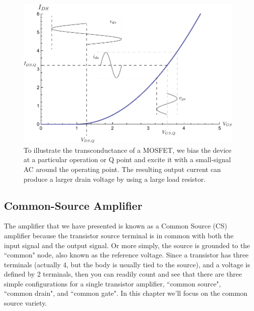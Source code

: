  
\begin{figure}[tb]
\begin{center}
\includegraphics[width=.75\columnwidth]{ids_vgs_vds}
\end{center}
\caption{To illustrate the transconductance of a MOSFET, we bias the device at a particular operation or Q point and excite it with a small-signal AC around the operating point.  The resulting output current can produce a larger drain voltage by using a large load resistor.} \label{fig:ids_vgs_vds}
\end{figure}




\subsection{Common-Source Amplifier}

The amplifier that we have presented is known as a Common Source (CS) amplifier because the transistor source terminal is in common with both the input signal and the output signal.  Or more simply, the source is grounded to the ``common" node, also known as the reference voltage.   Since a transistor has three terminals (actually 4, but the body is usually tied to the source), and a voltage is defined by 2 terminals, then you can readily count and see that there are three simple configurations for a single transistor amplifier, ``common source", ``common drain", and ``common gate".  In this chapter we'll focus on the common source variety.














